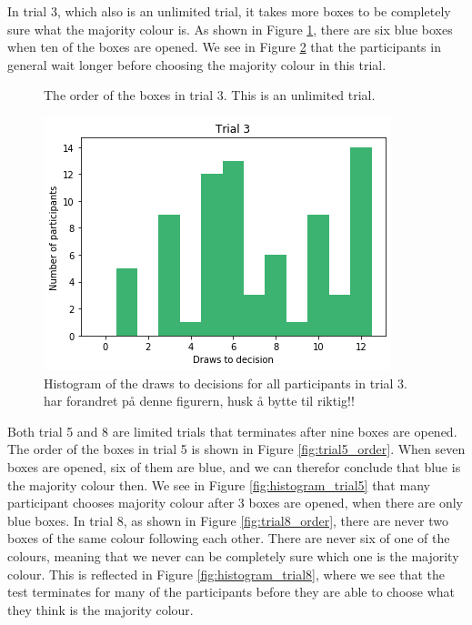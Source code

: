 In trial 3, which also is an unlimited trial, it takes more boxes to be completely sure what the majority colour is. As shown in Figure \ref{fig:trial3_order}, there are six blue boxes when ten of the boxes are opened. We see in Figure \ref{fig:histogram_trial3} that the participants in general wait longer before choosing the majority colour in this trial.

\begin{figure}
    \centering
    \scalebox{0.8}{}
    \caption[Order of boxes in trial 3]{The order of the boxes in trial 3. This is an unlimited trial.}
    \label{fig:trial3_order}
\end{figure}

\begin{figure}
    \centering
    \includegraphics[scale=0.6]{pictures/dtd3_histogram.png}
    \caption[Draws to decisions in trial 3]{Histogram of the draws to decisions for all participants in trial 3. 
    har forandret på denne figurern, husk å bytte til riktig!!}
    \label{fig:histogram_trial3}
\end{figure}

Both trial 5 and 8 are limited trials that terminates after nine boxes are opened. The order of the boxes in trial 5 is shown in Figure \ref{fig:trial5_order}. When seven boxes are opened, six of them are blue, and we can therefor conclude that blue is the majority colour then. We see in Figure \ref{fig:histogram_trial5} that many participant chooses majority colour after 3 boxes are opened, when there are only blue boxes. In trial 8, as shown in Figure \ref{fig:trial8_order}, there are never two boxes of the same colour following each other. There are never six of one of the colours, meaning that we never can be completely sure which one is the majority colour. This is reflected in Figure \ref{fig:histogram_trial8}, where we see that the test terminates for many of the participants before they are able to choose what they think is the majority colour. 

